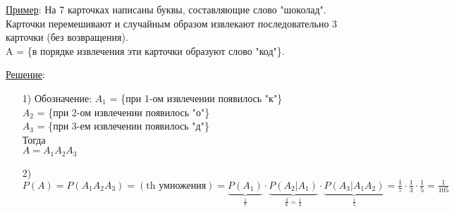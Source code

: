 \underline{Пример}: На 7 карточках написаны буквы, составляющие слово "шоколад". Карточки перемешивают и случайным образом извлекают последовательно 3 карточки (без возвращения). \\
A = \{в порядке извлечения эти карточки образуют слово "код"\}.

\underline{Решение}:
\begin{enumerate}
	\item[1)] 
	Обозначение:
	$A_1$ = \{при 1-ом извлечении появилось "к"\} \\
	$A_2$ = \{при 2-ом извлечении появилось "о"\} \\
	$A_3$ = \{при 3-ем извлечении появилось "д"\} \\
	Тогда \\
	$A = A_1 A_2 A_3$
	
	\item[2)]
	$\displaystyle P(A) = P(A_1 A_2 A_3) = (\text{th умножения}) = \underbrace{P(A_1)}_{\frac{1}{7}} \cdot \underbrace{P(A_2 |A_1)}_{\frac{2}{6} = \frac{1}{3}} \cdot \underbrace{P(A_3 |A_1 A_2)}_{\frac{1}{5}} = \frac{1}{7} \cdot \frac{1}{3} \cdot \frac{1}{5} = \frac{1}{105}$
\end{enumerate}



























